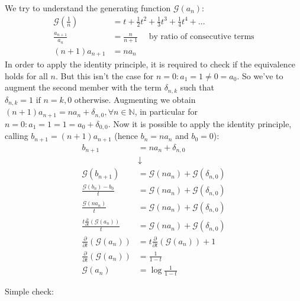 We try to understand the generating function $\mathcal{G}(a_n) $:
\begin{displaymath}
  \begin{split}
    \mathcal{G} ( \frac{1}{n} ) &= t + \frac{1}{2} t^2 +  \frac{1}{3}
    t^3 +  \frac{1}{4} t^4 + \ldots \\
     \frac{a_{n+1}}{a_n} &=  \frac{n}{n+1} \quad \text{ by ratio of
       consecutive terms}\\
      (n+1)a_{n+1}  &= n a_n
  \end{split}
\end{displaymath}
In order to apply the identity principle, it is required to check if
the equivalence holds for all $n$. But this isn't the case for
$n=0:a_{1} = 1 \not = 0 = a_0$. So we've to augment the second member
with the term $\delta_{n,k}$ such that $\delta_{n,k} = 1 \text{ if }
n=k, 0 \text{ otherwise}$. Augmenting we obtain $(n+1)a_{n+1} = n a_n
+ \delta_{n,0}, \forall n \in \mathbb{N} $, in particular for
$n=0:a_{1} = 1 = 1 = a_0 + \delta_{0,0}$. Now it is possible to apply
the identity principle, calling $b_{n+1} = (n+1)a_{n+1}$ (hence $b_n
=n a_n$ and $b_0 = 0$):
\begin{displaymath}
  \begin{split}
    b_{n+1} &= n a_n + \delta_{n,0} \\
    &\downarrow \\
    \mathcal{G} (b_{n+1}) &= \mathcal{G} (n a_n) + \mathcal{G}
    (\delta_{n,0}) \\
    \frac{\mathcal{G} (b_n) - b_0}{t} &= \mathcal{G} (n a_n) +
    \mathcal{G}
    (\delta_{n,0}) \\
    \frac{\mathcal{G} (n a_n)}{t} &= \mathcal{G} (n a_n) + \mathcal{G}
    (\delta_{n,0}) \\
    \frac{t \frac{\partial}{\partial t}\left( \mathcal{G} (a_n)
      \right) }{t} &= \mathcal{G} (n a_n) + \mathcal{G}
    (\delta_{n,0}) \\
    \frac{\partial}{\partial t}\left( \mathcal{G} (a_n) \right) &= t
    \frac{\partial}{\partial t}\left( \mathcal{G} (a_n) \right) + 1 \\
    \frac{\partial}{\partial t}\left( \mathcal{G} (a_n) \right) &=
    \frac{1}{1-t}\\
    \mathcal{G} (a_n) &= \log{ \frac{1}{1-t} }
  \end{split}
\end{displaymath}

Simple check:

